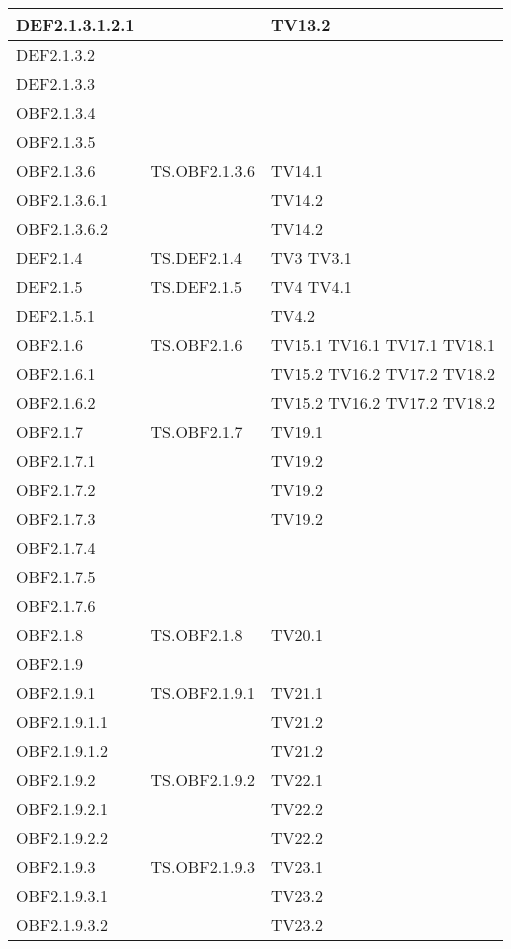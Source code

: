 \documentclass{scalatekids-article}
\begin{document}
\begin{longtable}[H]{|l|p{4cm}|p{4cm}|}
  \hline
  DEF2.1.3.1.2.1 & & TV13.2\\
  \hline
  DEF2.1.3.2 & &\\ %
  \hline
  DEF2.1.3.3 & &\\ %
  \hline
  OBF2.1.3.4 & &\\ %
  \hline
  OBF2.1.3.5 & &\\ %
  \hline
  OBF2.1.3.6 & TS.OBF2.1.3.6 & TV14.1\\
  \hline
  OBF2.1.3.6.1 & & TV14.2\\
  \hline
  OBF2.1.3.6.2 & & TV14.2\\
  \hline
  DEF2.1.4 & TS.DEF2.1.4 & TV3 TV3.1\\
  \hline
  DEF2.1.5 & TS.DEF2.1.5 & TV4 TV4.1\\
  \hline
  DEF2.1.5.1 & & TV4.2\\
  \hline
  OBF2.1.6 & TS.OBF2.1.6 & TV15.1 TV16.1 TV17.1 TV18.1\\
  \hline
  OBF2.1.6.1 & & TV15.2 TV16.2 TV17.2 TV18.2\\
  \hline
  OBF2.1.6.2 & & TV15.2 TV16.2 TV17.2 TV18.2\\
  \hline
  OBF2.1.7 & TS.OBF2.1.7 & TV19.1\\
  \hline
  OBF2.1.7.1 & & TV19.2\\
  \hline
  OBF2.1.7.2 & & TV19.2\\
  \hline
  OBF2.1.7.3 & & TV19.2\\
  \hline
  OBF2.1.7.4 & &\\ %
  \hline
  OBF2.1.7.5 & &\\ %
  \hline
  OBF2.1.7.6 & &\\ %
  \hline
  OBF2.1.8 & TS.OBF2.1.8 & TV20.1\\
  \hline
  OBF2.1.9 & &\\
  \hline
  OBF2.1.9.1 & TS.OBF2.1.9.1 & TV21.1\\
  \hline
  OBF2.1.9.1.1 & & TV21.2\\
  \hline
  OBF2.1.9.1.2 & & TV21.2\\
  \hline
  OBF2.1.9.2 & TS.OBF2.1.9.2 & TV22.1\\
  \hline
  OBF2.1.9.2.1 & & TV22.2\\
  \hline
  OBF2.1.9.2.2 & & TV22.2\\
  \hline
  OBF2.1.9.3 & TS.OBF2.1.9.3 & TV23.1\\
  \hline
  OBF2.1.9.3.1 & & TV23.2\\
  \hline
  OBF2.1.9.3.2 & & TV23.2\\
  \hline

\end{longtable}
\end{document}
